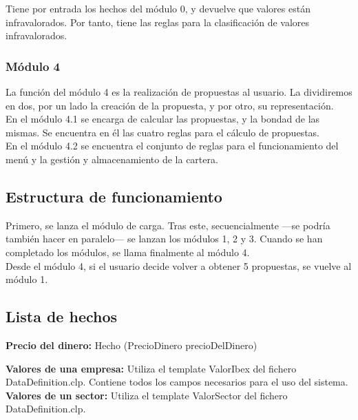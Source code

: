 Tiene por entrada los hechos del módulo 0, y devuelve que valores están infravalorados. Por tanto, tiene las reglas para la clasificación de valores infravalorados.\\

\subsubsection{Módulo 4}

La función del módulo 4 es la realización de propuestas al usuario. La dividiremos en dos, por un lado la creación de la propuesta, y por otro, su representación.\\

En el módulo 4.1 se encarga de calcular las propuestas, y la bondad de las mismas. Se encuentra en él las cuatro reglas para el cálculo de propuestas.\\

En el módulo 4.2 se encuentra el conjunto de reglas para el funcionamiento del menú y la gestión y almacenamiento de la cartera.\\

\subsection{Estructura de funcionamiento}

Primero, se lanza el módulo de carga. Tras este, secuencialmente ---se podría también hacer en paralelo--- se lanzan los módulos 1, 2 y 3. Cuando se han completado los módulos, se llama finalmente al módulo 4.\\

Desde el módulo 4, si el usuario decide volver a obtener 5 propuestas, se vuelve al módulo 1.\\

\subsection{Lista de hechos}

\textbf{Precio del dinero:} Hecho (PrecioDinero precioDelDinero)

\textbf{Valores de una empresa:} Utiliza el template ValorIbex del fichero DataDefinition.clp. Contiene todos los campos necesarios para el uso del sistema.\\

\textbf{Valores de un sector:} Utiliza el template ValorSector del fichero DataDefinition.clp.\\

